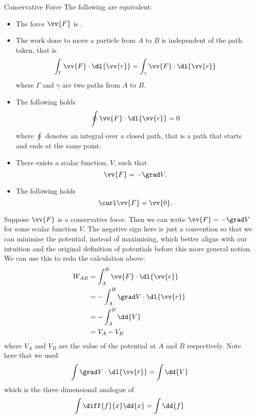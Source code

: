 \documentclass[fleqn]{NotesClass}
\begin{document}
    \begin{dfn}{Conservative Force}{}
        The following are equivalent:
        \begin{itemize}
            \item The force \(\vv{F}\) is .
            \item The work done to move a particle from \(A\) to \(B\) is independent of the path taken, that is
            \begin{equation}
                \int_\Gamma \vv{F}\cdot\dl{\vv{r}} = \int_\gamma \vv{F}\cdot\dl{\vv{r}}
            \end{equation}
            where \(\Gamma\) and \(\gamma\) are two paths from \(A\) to \(B\).
            \item The following holds
            \begin{equation}
                \oint \vv{F}\cdot\dl{\vv{r}} = 0
            \end{equation}
            where \(\oint\) denotes an integral over a closed path, that is a path that starts and ends at the same point.
            \item There exists a scalar function, \(V\), such that
            \begin{equation}
                \vv{F} = -\grad V.
            \end{equation}
            \item The following holds
            \begin{equation}
                \curl\vv{F} = \vv{0}.
            \end{equation}
        \end{itemize}
    \end{dfn}
    
    Suppose \(\vv{F}\) is a conservative force.
    Then we can write \(\vv{F} = -\grad V\) for some scalar function \(V\). The negative sign here is just a convention so that we can minimise the potential, instead of maximising, which better aligns with our intuition and the original definition of potentials before this more general notion.
    We can use this to redo the calculation above:
    \begin{align}
        W_{AB} &= \int_{A}^{B}\vv{F}\cdot\dl{\vv{r}}\\
        &= -\int_A^B \grad V \cdot\dl{\vv{r}}\\
        &= -\int_A^B\dd{V}\\
        &= V_A - V_B\label{eqn:W=Vb-Va}
    \end{align}
    where \(V_A\) and \(V_B\) are the value of the potential at \(A\) and \(B\) respectively.
    Note here that we used
    \begin{equation}
        \int\grad V\cdot\dl{\vv{r}} = \int\dd{V}
    \end{equation}
    which is the three dimensional analogue of
    \begin{equation}
        \int \diff{f}{x}\dd{x} = \int\dd{f}
    \end{equation}
    
\end{document}
